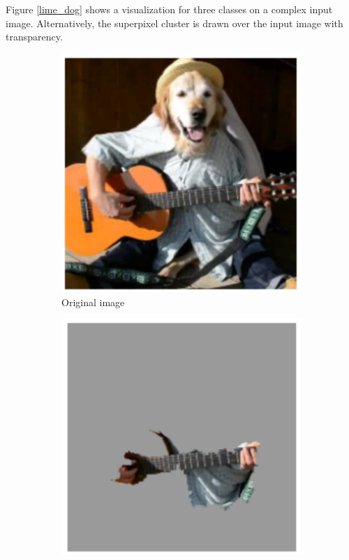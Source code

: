 Figure \ref{lime_dog} shows a visualization for three classes on a complex input image. Alternatively, the superpixel cluster is drawn over the input image with transparency.

\begin{figure}[H]
    \centering
    \begin{subfigure}[t]{.23\textwidth}
        \centering
        \includegraphics[width=\linewidth]{chapters/02_methods/images/lime_dog_1.png}
        \caption{Original image}
    \end{subfigure}\hfill%
    \begin{subfigure}[t]{.23\textwidth}
        \centering
        \includegraphics[width=\linewidth]{chapters/02_methods/images/lime_dog_2.png}

\end{subfigure}
\end{figure}

